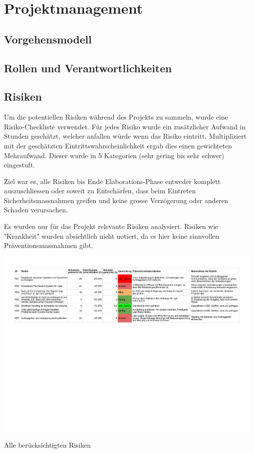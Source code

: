 \part{Projektmanagement}

\chapter{Vorgehensmodell}

\xxx

\chapter{Rollen und Verantwortlichkeiten}

\xxx

\chapter{Risiken}\label{sec:risiken}

Um die potentiellen Risiken während des Projekts zu sammeln, wurde eine  Risiko-Checkliste verwendet. Für jedes Risiko wurde ein zusätzlicher Aufwand in Stunden geschätzt, welcher anfallen würde wenn das Risiko eintritt. Multipliziert mit der geschätzten Eintrittswahrscheinlichkeit ergab dies einen gewichteten Mehraufwand. Dieser wurde in 5 Kategorien (sehr gering bis sehr schwer) eingestuft.

Ziel war es, alle Risiken bis Ende Elaborations-Phase entweder komplett auszuschliessen oder soweit zu Entschärfen, dass beim Eintreten Sicherheitsmassnahmen greifen und keine grosse Verzögerung oder anderen Schaden verursachen.

Es wurden nur für das Projekt relevante Risiken analysiert. Risiken wie "Krankheit" wurden absichtlich nicht notiert, da es hier keine sinnvollen Präventionsmassnahmen gibt.

\begin{landscape}
	\begin{table}[H]
		\centering
		\includegraphics[height=.9\textheight,keepaspectratio]{Risikoanalyse.pdf}
		\caption{Alle berücksichtigten Risiken}
		\label{tab:risikoanalyse}
	\end{table}
\end{landscape}

